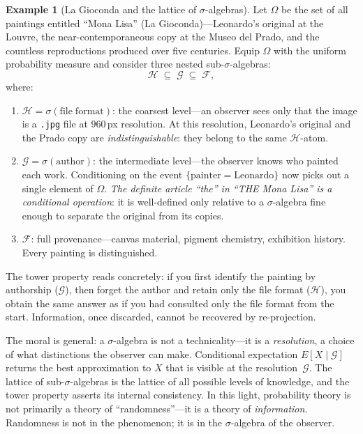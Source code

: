 \documentclass[12pt]{amsart}
\theoremstyle{definition}
\newtheorem{example}[theorem]{Example}
\theoremstyle{remark}
\newcommand{\cF}{\mathcal{F}}
\begin{document}
\begin{example}[La Gioconda and the lattice of $\sigma$-algebras]\label{ex:gioconda}
Let $\Omega$ be the set of all paintings entitled ``Mona Lisa'' (La Gioconda)---Leonardo's original at the Louvre, the near-contemporaneous copy at the Museo del Prado, and the countless reproductions produced over five centuries. Equip $\Omega$ with the uniform probability measure and consider three nested sub-$\sigma$-algebras:
\[
\mathcal{H} \;\subseteq\; \mathcal{G} \;\subseteq\; \cF,
\]
where:
\begin{enumerate}[label=(\roman*)]
\item $\mathcal{H} = \sigma(\mathrm{file\; format})$: the coarsest level---an observer sees only that the image is a \texttt{.jpg} file at $960$\,px resolution. At this resolution, Leonardo's original and the Prado copy are \emph{indistinguishable}: they belong to the same $\mathcal{H}$-atom.
\item $\mathcal{G} = \sigma(\mathrm{author})$: the intermediate level---the observer knows who painted each work. Conditioning on the event $\{\mathrm{painter} = \text{Leonardo}\}$ now picks out a single element of $\Omega$. \emph{The definite article ``the'' in ``THE Mona Lisa'' is a conditional operation}: it is well-defined only relative to a $\sigma$-algebra fine enough to separate the original from its copies.
\item $\cF$: full provenance---canvas material, pigment chemistry, exhibition history. Every painting is distinguished.
\end{enumerate}

The tower property reads concretely: if you first identify the painting by authorship ($\mathcal{G}$), then forget the author and retain only the file format ($\mathcal{H}$), you obtain the same answer as if you had consulted only the file format from the start. Information, once discarded, cannot be recovered by re-projection.

The moral is general: a $\sigma$-algebra is not a technicality---it is a \emph{resolution}, a choice of what distinctions the observer can make. Conditional expectation $E[X \mid \mathcal{G}]$ returns the best approximation to $X$ that is visible at the resolution~$\mathcal{G}$. The lattice of sub-$\sigma$-algebras is the lattice of all possible levels of knowledge, and the tower property asserts its internal consistency. In this light, probability theory is not primarily a theory of ``randomness''---it is a theory of \emph{information}. Randomness is not in the phenomenon; it is in the $\sigma$-algebra of the observer.
\end{example}
\end{document}
